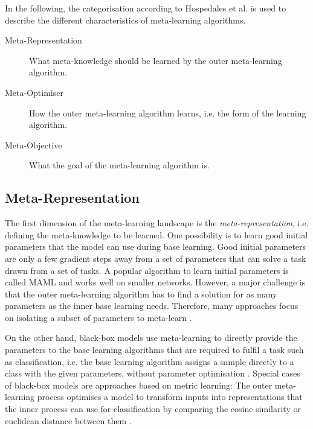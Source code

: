In the following, the categorisation according to Hospedales et al. \cite{Hospedales_Antoniou_Micaelli_Storkey_2021} is used to describe the different characteristics of meta-learning algorithms.
\begin{description}
   \item[Meta-Representation] What meta-knowledge should be learned by the outer meta-learning algorithm.
   \item[Meta-Optimiser] How the outer meta-learning algorithm learns, i.e. the form of the learning algorithm.
   \item[Meta-Objective] What the goal of the meta-learning algorithm is.
\end{description}


\subsection{Meta-Representation}
The first dimension of the meta-learning landscape is the \emph{meta-representation}, i.e. defining the meta-knowledge to be learned.
One possibility is to learn good initial parameters that the model can use during base learning.
Good initial parameters are only a few gradient steps away from a set of parameters that can solve a task drawn from a set of tasks.
A popular algorithm to learn initial parameters is called MAML  and works well on smaller networks.
However, a major challenge is that the outer meta-learning algorithm has to find a solution for as many parameters as the inner base learning needs.
Therefore, many approaches focus on isolating a subset of parameters to meta-learn \cite{lee2018gradient, qiao2018few, rusu2018meta}.

On the other hand, black-box models use meta-learning to directly provide the parameters to the base learning algorithms that are required to fulfil a task such as classification, i.e. the base learning algorithm assigns a sample directly to a class with the given parameters, without parameter optimisation \cite{heskes2000empirical, 10-5555-3454287-3455002, Ha_Dai_Le_2016}.
Special cases of black-box models are approaches based on metric learning:
The outer meta-learning process optimises a model to transform inputs into representations that the inner process can use for classification by comparing the cosine similarity or euclidean distance between them \cite{10-5555-3294996-3295163, qiao2018few, Chen_Liu_Kira_Wang_Huang_2020}.

